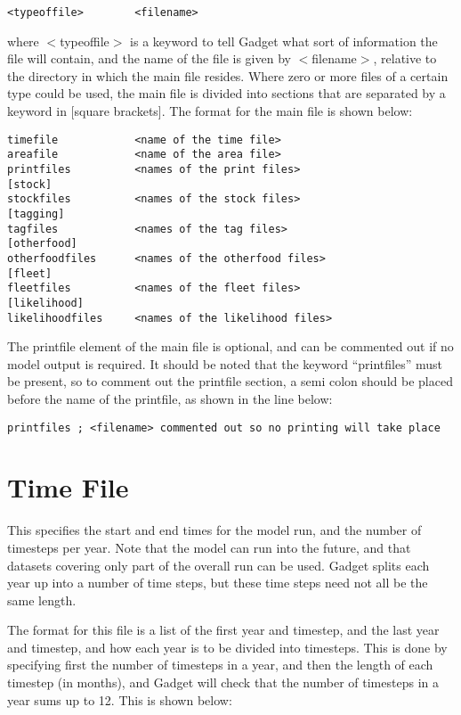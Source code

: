 \documentclass[]{book}
\begin{document}
\begin{verbatim}
<typeoffile>        <filename>
\end{verbatim}

where \(<\)typeoffile\(>\) is a keyword to tell Gadget what sort of
information the file will contain, and the name of the file is given by
\(<\)filename\(>\), relative to the directory in which the main file
resides. Where zero or more files of a certain type could be used, the
main file is divided into sections that are separated by a keyword in
{[}square brackets{]}. The format for the main file is shown below:

\begin{verbatim}
timefile            <name of the time file>
areafile            <name of the area file>
printfiles          <names of the print files>
[stock]
stockfiles          <names of the stock files>
[tagging]
tagfiles            <names of the tag files>
[otherfood]
otherfoodfiles      <names of the otherfood files>
[fleet]
fleetfiles          <names of the fleet files>
[likelihood]
likelihoodfiles     <names of the likelihood files>
\end{verbatim}

The printfile element of the main file is optional, and can be commented
out if no model output is required. It should be noted that the keyword
``printfiles'' must be present, so to comment out the printfile section, a
semi colon should be placed before the name of the printfile, as shown
in the line below:

\begin{verbatim}
printfiles ; <filename> commented out so no printing will take place
\end{verbatim}

\hypertarget{sec:timefile}{%
\section{Time File}\label{sec:timefile}}

This specifies the start and end times for the model run, and the number
of timesteps per year. Note that the model can run into the future, and
that datasets covering only part of the overall run can be used. Gadget
splits each year up into a number of time steps, but these time steps
need not all be the same length.

The format for this file is a list of the first year and timestep, and
the last year and timestep, and how each year is to be divided into
timesteps. This is done by specifying first the number of timesteps in a
year, and then the length of each timestep (in months), and Gadget will
check that the number of timesteps in a year sums up to 12. This is
shown below:
\end{document}
